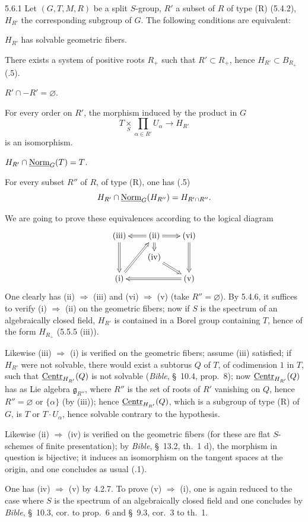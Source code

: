 \begin{proposition}{5.6.1}\label{XXII.5.6.1}
Let $(G,T,M,R)$ be a split $S$-group, $R'$ a subset of $R$ of type (R) (5.4.2), $H_{R'}$ the corresponding subgroup of $G$. The following conditions are equivalent:
\begin{enumeratei}
\item $H_{R'}$ has solvable geometric fibers.
\item There exists a system of positive roots $R_+$ such that $R'\subset R_+$, hence $H_{R'}\subset B_{R_+}$ (.5).
\item $R'\cap-R'=\varnothing$.
\item For every order on $R'$, the morphism induced by the product in $G$
\[
T\underset S\times\prod_{\alpha\in R'}U_\alpha\to H_{R'}
\]
is an isomorphism.
\item $H_{R'}\cap\underline{\mathrm{Norm}}_G(T)=T$.
\item For every subset $R''$ of $R$, of type (R), one has (.5)
\[
H_{R'}\cap\underline{\mathrm{Norm}}_G(H_{R''})=H_{R'\cap R''}.
\]
\end{enumeratei}
\end{proposition}
We are going to prove these equivalences according to the logical diagram
\[
\xymatrix@R=1em@C=2em{\text{(iii)}\ar@{=>}[dd]&\text{(ii)}\ar@{=>}[l]\ar@{=>}[r]\ar@{=>}[d]&\text{(vi)}\ar@{=>}[dd]\\
&\text{(iv)}\ar@{=>}[dr]&\\
\text{(i)}\ar@{=>}[uur]&&\text{(v)}\ar@{=>}[ll].}
\]
One clearly has (ii) $\Rightarrow$ (iii) and (vi) $\Rightarrow$ (v) (take $R''=\varnothing$). By 5.4.6, it suffices to verify (i) $\Rightarrow$ (ii) on the geometric fibers; now if $S$ is the spectrum of an algebraically closed field, $H_{R'}$ is contained in a Borel group containing $T$, hence of the form $H_{R_+}$ (5.5.5 (iii)).

Likewise (iii) $\Rightarrow$ (i) is verified on the geometric fibers; assume (iii) satisfied; if $H_{R'}$ were not solvable, there would exist a subtorus $Q$ of $T$, of codimension $1$ in $T$, such that $\underline{\mathrm{Centr}}_{H_{R'}}(Q)$ is not solvable (\textit{Bible}, \S~10.4, prop.~8); now $\underline{\mathrm{Centr}}_{H_{R'}}(Q)$ has as Lie algebra $\mathfrak g_{R''}$, where $R''$ is the set of roots of $R'$ vanishing on $Q$, hence $R''=\varnothing$ or $\{\alpha\}$ (by (iii)); hence $\underline{\mathrm{Centr}}_{H_{R'}}(Q)$, which is a subgroup of type (R) of $G$, is $T$ or $T\cdot U_\alpha$, hence solvable contrary to the hypothesis.

Likewise (ii) $\Rightarrow$ (iv) is verified on the geometric fibers (for these are flat $S$-schemes of finite presentation); by \textit{Bible}, \S~13.2, th.~1 d), the morphism in question is bijective; it induces an isomorphism on the tangent spaces at the origin, and one concludes as usual (.1).

One has (iv) $\Rightarrow$ (v) by 4.2.7. To prove (v) $\Rightarrow$ (i), one is again reduced to the case where $S$ is the spectrum of an algebraically closed field and one concludes by \textit{Bible}, \S~10.3, cor. to prop.~6 and \S~9.3, cor.~3 to th.~1.
